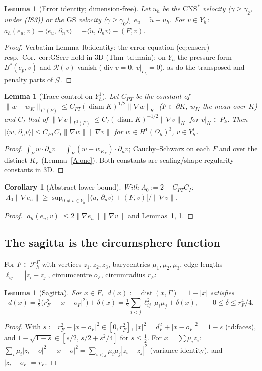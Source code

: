 \documentclass[11pt]{article}
\newtheorem{lemma}[theorem]{Lemma}
\newtheorem{corollary}[theorem]{Corollary}
\theoremstyle{definition}
\newcommand{\Gh}{\Gamma_h}
\newcommand{\Oh}{\Omega_h}
\newcommand{\FG}{\mathcal F_h^\Gamma}
\newcommand{\dn}{\partial_n}
\newcommand{\ut}{\tilde u}
\newcommand{\ip}[2]{\langle #1,\, #2\rangle}
\newcommand{\norm}[1]{\lVert #1\rVert}
\newcommand{\GS}{\mathrm{GS}}
\newcommand{\CNS}{\mathrm{CNS}^\ast}
\renewcommand{\div}{\operatorname{div}}
\newcommand{\Gc}{\mathcal G}
\newcommand{\Rc}{\mathcal R}
\DeclareMathOperator{\diam}{diam}
\DeclareMathOperator{\dist}{dist}
\begin{document}
\begin{lemma}[Error identity; dimension-free]\label{A:identity}
Let $u_h$ be the $\CNS$ velocity ($\gamma\ge\gamma_2$, under (IS3)) or the $\GS$ velocity ($\gamma\ge\gamma_0$), $e_u=\ut-u_h$. For $v\in Y_h$:
$a_h(e_u,v)-\ip{e_u}{\dn v}=-\ip{\ut}{\dn v}-(F,v)$.
\end{lemma}
\begin{proof}
Verbatim Lemma~lb:identity: the error equation (eq:cnserr) resp.\ Cor.~cor:GSerr hold in 3D (Thm~td:main); on $Y_h$ the pressure form $B^\ast(e_p,v)$ and $\Rc(v)$ vanish ($\div v=0$, $v|_{\Gh}=0$), as do the transposed and penalty parts of $\Gc$.
\end{proof}

\begin{lemma}[Trace control on $Y_h^1$]\label{A:poinc}
Let $C_{PT}$ be the constant of $\norm{w-\bar w_K}_{L^2(F)}\le C_{PT}(\diam K)^{1/2}\norm{\nabla w}_K$ ($F\subset\partial K$, $\bar w_K$ the mean over $K$) and $C_I$ that of $\norm{\nabla v}_{L^2(F)}\le C_I(\diam K)^{-1/2}\norm{\nabla v}_K$ for $v|_K\in P_k$. Then $|\ip{w}{\dn v}|\le C_{PT}C_I\norm{\nabla w}\norm{\nabla v}$ for $w\in H^1(\Oh)^3$, $v\in Y_h^1$.
\end{lemma}
\begin{proof}
$\int_Fw\cdot\dn v=\int_F(w-\bar w_{K_F})\cdot\dn v$; Cauchy--Schwarz on each $F$ and over the distinct $K_F$ (Lemma~\ref{A:one}). Both constants are scaling/shape-regularity constants in 3D.
\end{proof}

\begin{corollary}[Abstract lower bound]\label{A:abstract}
With $\Lambda_0:=2+C_{PT}C_I$: $\ \Lambda_0\norm{\nabla e_u}\ge\sup_{0\ne v\in Y_h^1}|\ip{\ut}{\dn v}+(F,v)|/\norm{\nabla v}$.
\end{corollary}
\begin{proof}
$|a_h(e_u,v)|\le2\norm{\nabla e_u}\norm{\nabla v}$ and Lemmas~\ref{A:identity}, \ref{A:poinc}.
\end{proof}

\subsection{The sagitta is the circumsphere function}
For $F\in\FG$ with vertices $z_1,z_2,z_3$, barycentrics $\mu_1,\mu_2,\mu_3$, edge lengths $\ell_{ij}=|z_i-z_j|$, circumcentre $o_F$, circumradius $r_F$:

\begin{lemma}[Sagitta]\label{A:sag}
For $x\in F$, $\ d(x):=\dist(x,\Gamma)=1-|x|$ satisfies
\[
d(x)=\tfrac12\bigl(r_F^2-|x-o_F|^2\bigr)+\delta(x)=\tfrac12\sum_{i<j}\ell_{ij}^2\,\mu_i\mu_j+\delta(x),\qquad 0\le\delta\le r_F^4/4 .
\]
\end{lemma}
\begin{proof}
With $s:=r_F^2-|x-o_F|^2\in[0,r_F^2]$, $|x|^2=d_F^2+|x-o_F|^2=1-s$ (td:faces), and $1-\sqrt{1-s}\in[s/2,\,s/2+s^2/4]$ for $s\le\frac12$. For $x=\sum\mu_iz_i$: $\sum_i\mu_i|z_i-o|^2-|x-o|^2=\sum_{i<j}\mu_i\mu_j|z_i-z_j|^2$ (variance identity), and $|z_i-o_F|=r_F$.
\end{proof}
\end{document}
